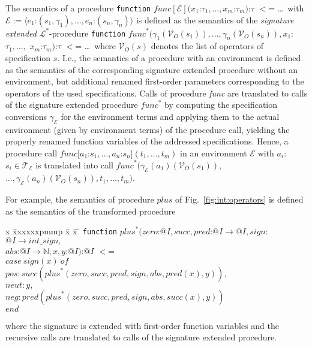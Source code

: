 \documentclass{article}
\theoremstyle{remark}
\theoremstyle{definition}
\newcommand{\vflang}{\ensuremath{\mathcal{L}}}
\newcommand{\iend}{\mathit{end}\ }
\newcommand{\icase}{\mathit{case}\ }
\newcommand{\iof}{\mathit{of}\ }
\newcommand{\nat}{\mathbb{N}}
\newcommand{\name}[1]{\mathit{#1}}
\newcommand{\vars}{\mathcal{V}}
\newcommand{\terms}{\mathcal{T}}
\newcommand{\env}{\mathcal{E}}
\newcommand{\envterms}{\terms_\env}
\begin{document}
The semantics of a procedure \texttt{function} $\name{func}[\env](x_1$:$\tau_1,\ldots,x_m$:$\tau_m)$:$\tau$ $<$=
\ldots\ with $\env := \langle e_1$:$(s_1,\gamma_1),\ldots,e_n$:$(s_n,\gamma_n) \rangle$ is defined as the semantics of
the \emph{signature extended} $\vflang^*$-procedure \texttt{function}
$\name{func}^*(\gamma_1(\vars_O(s_1)),\ldots,\gamma_n(\vars_O(s_n)),x_1$:$\tau_1,\ldots,$ $x_m$:$\tau_m)$:$\tau$ $<$=
\ldots\ where $\vars_O(s)$ denotes the list of operators of specification $s$. I.e., the semantics of a procedure with
an environment is defined as the semantics of the corresponding signature extended procedure without an environment,
but additional renamed first-order parameters corresponding to the operators of the used specifications.
%
Calls of procedure \emph{func} are translated to calls of the signature extended procedure $\name{func}^*$ by computing
the specification conversions $\gamma_\env$ for the environment terms and applying them to the actual environment
(given by environment terms) of the procedure call, yielding the properly renamed function variables of the addressed
specifications. Hence, a procedure call $\name{func}[a_1$:$s_1,\ldots,a_n$:$s_n](t_1,\ldots,t_m)$ in an environment
$\env$ with $a_i$:$s_i \in \envterms$ is translated into call $\name{func}^*(\gamma_\env(a_1)(\vars_O(s_1)),$
$\ldots,\gamma_\env(a_n)(\vars_O(s_n)),t_1,\ldots,t_m)$.

For example, the semantics of procedure $\name{plus}$ of Fig.~\ref{fig:int:operators} is defined as the semantics of
the transformed procedure
\begin{tabbing}
x \= xxxxxxpmmp \= x \= x \=  \kill
\texttt{function} $\name{plus}^*(\name{zero}$:$@I,\name{succ},\name{pred}$:$@I\rightarrow@I,\name{sign}$:$@I \rightarrow \name{int\_sign},$ \\
\> \> $\name{abs}$:$@I \rightarrow \nat,x,y$:$@I)$:$@I$ $<$= \\
$\icase \name{sign}(x)\ \iof$ \\
\> $\name{pos}: \name{succ}(\name{plus}^*(\name{zero},\name{succ},\name{pred},\name{sign},\name{abs},\name{pred}(x),y)),$ \\
\> $\name{neut}: y,$ \\
\> $\name{neg}: \name{pred}(\name{plus}^*(\name{zero},\name{succ},\name{pred},\name{sign},\name{abs},\name{succ}(x),y))$ \\
$\iend$
\end{tabbing}
where the signature is extended with first-order function variables and the recursive calls are translated to calls of
the signature extended procedure.
\end{document}
